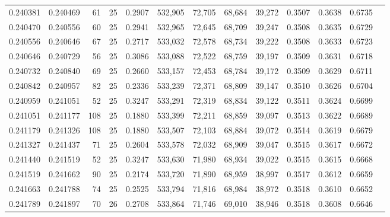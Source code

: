\begin{tabular}{rrrrrrrrrrrrr}
0.240381 & 0.240469 &    61 &  25 &                                     0.2907 & 532,905 &  72,705 &  68,684 &  39,272 & 0.3507 & 0.3638 & 0.6735 \\
0.240470 & 0.240556 &    60 &  25 &                                     0.2941 & 532,965 &  72,645 &  68,709 &  39,247 & 0.3508 & 0.3635 & 0.6729 \\
0.240556 & 0.240646 &    67 &  25 &                                     0.2717 & 533,032 &  72,578 &  68,734 &  39,222 & 0.3508 & 0.3633 & 0.6723 \\
0.240646 & 0.240729 &    56 &  25 &                                     0.3086 & 533,088 &  72,522 &  68,759 &  39,197 & 0.3509 & 0.3631 & 0.6718 \\
0.240732 & 0.240840 &    69 &  25 &                                     0.2660 & 533,157 &  72,453 &  68,784 &  39,172 & 0.3509 & 0.3629 & 0.6711 \\
0.240842 & 0.240957 &    82 &  25 &                                     0.2336 & 533,239 &  72,371 &  68,809 &  39,147 & 0.3510 & 0.3626 & 0.6704 \\
0.240959 & 0.241051 &    52 &  25 &                                     0.3247 & 533,291 &  72,319 &  68,834 &  39,122 & 0.3511 & 0.3624 & 0.6699 \\
0.241051 & 0.241177 &   108 &  25 &                                     0.1880 & 533,399 &  72,211 &  68,859 &  39,097 & 0.3513 & 0.3622 & 0.6689 \\
0.241179 & 0.241326 &   108 &  25 &                                     0.1880 & 533,507 &  72,103 &  68,884 &  39,072 & 0.3514 & 0.3619 & 0.6679 \\
0.241327 & 0.241437 &    71 &  25 &                                     0.2604 & 533,578 &  72,032 &  68,909 &  39,047 & 0.3515 & 0.3617 & 0.6672 \\
0.241440 & 0.241519 &    52 &  25 &                                     0.3247 & 533,630 &  71,980 &  68,934 &  39,022 & 0.3515 & 0.3615 & 0.6668 \\
0.241519 & 0.241662 &    90 &  25 &                                     0.2174 & 533,720 &  71,890 &  68,959 &  38,997 & 0.3517 & 0.3612 & 0.6659 \\
0.241663 & 0.241788 &    74 &  25 &                                     0.2525 & 533,794 &  71,816 &  68,984 &  38,972 & 0.3518 & 0.3610 & 0.6652 \\
0.241789 & 0.241897 &    70 &  26 &                                     0.2708 & 533,864 &  71,746 &  69,010 &  38,946 & 0.3518 & 0.3608 & 0.6646 \\

\end{tabular}
